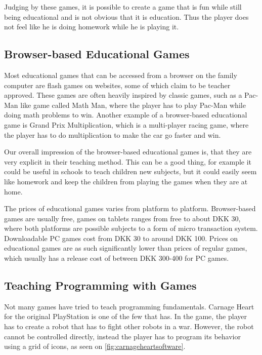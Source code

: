 Judging by these games, it is possible to create a game that is fun while still being educational and is not obvious that it is education. Thus the player does not feel like he is doing homework while he is playing it.

\subsection{Browser-based Educational Games}
Most educational games that can be accessed from a browser on the family computer are flash games on websites, some of which claim to be teacher approved.
These games are often heavily inspired by classic games, such as a Pac-Man like game called Math Man, where the player has to play Pac-Man while doing math problems to win.\cite{mathman} Another example of a browser-based educational game is Grand Prix Multiplication, which is a multi-player racing game, where the player has to do multiplication to make the car go faster and win.\cite{grandprix}\newline

Our overall impression of the browser-based educational games is, that they are very explicit in their teaching method.
This can be a good thing, for example it could be useful in schools to teach children new subjects, but it could easily seem like homework and keep the children from playing the games when they are at home.\newline

The prices of educational games varies from platform to platform. 
Browser-based games are usually free, games on tablets ranges from free to about DKK 30, where both platforms are possible subjects to a form of micro transaction system.
Downloadable PC games cost from DKK 30 to around DKK 100.
Prices on educational games are as such significantly lower than prices of regular games, which usually has a release cost of between DKK 300-400 for PC games.

\subsection{Teaching Programming with Games}
Not many games have tried to teach programming fundamentals. Carnage Heart for the original PlayStation is one of the few that has. In the game, the player has to create a robot that has to fight other robots in a war. However, the robot cannot be controlled directly, instead the player has to program its behavior using a grid of icons, as seen on \autoref{fig:carnageheartsoftware}.

